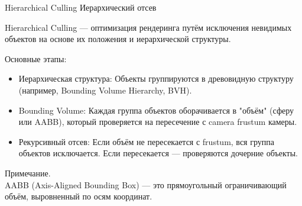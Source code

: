 \documentclass{beamer}
\begin{document}
	\begin{frame}{Hierarchical Culling }{Иерархический отсев}
		
		Hierarchical Culling --- оптимизация рендеринга путём исключения невидимых объектов на основе их положения и иерархической структуры.


		Основные этапы:
		\begin{itemize}
			\item 	
			Иерархическая структура: Объекты группируются в древовидную структуру (например, Bounding Volume Hierarchy, BVH).
			\item 
			Bounding Volume: Каждая группа объектов оборачивается в "объём" (сферу или AABB), который проверяется на пересечение с camera frustum камеры.
			\item 
			Рекурсивный отсев: Если объём не пересекается с frustum, вся группа объектов исключается. Если пересекается — проверяются дочерние объекты.
		\end{itemize}
	
		Примечание. \\
		AABB (Axis-Aligned Bounding Box) — это прямоугольный ограничивающий объём, выровненный по осям координат.


	\end{frame}
\end{document}

